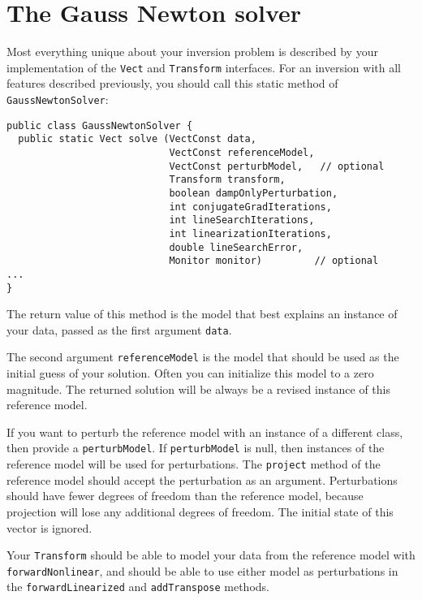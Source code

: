 \documentclass[12pt]{article}
\begin{document}
\section {The Gauss Newton solver}

Most everything unique about your inversion
problem is described by your implementation
of the \texttt{Vect} and \texttt{Transform}
interfaces.  For an inversion with all
features described previously, you should
call this static method of
\texttt{Gauss\-Newton\-Solver}:

{\footnotesize \begin{verbatim} 
public class GaussNewtonSolver {
  public static Vect solve (VectConst data,
                            VectConst referenceModel,
                            VectConst perturbModel,   // optional
                            Transform transform,     
                            boolean dampOnlyPerturbation,
                            int conjugateGradIterations,
                            int lineSearchIterations,
                            int linearizationIterations,
                            double lineSearchError,
                            Monitor monitor)         // optional
...
}
\end{verbatim}} 

The return value of this method is the model
that best explains an instance of your data,
passed as the first argument \texttt{data}.

The second argument \texttt{referenceModel}
is the model that should be used as the
initial guess of your solution.  Often you
can initialize this model to a zero
magnitude.  The returned solution will be
always be a revised instance of this
reference model.

If you want to perturb the reference model
with an instance of a different class, then
provide a \texttt{perturbModel}.  If
\texttt{perturbModel} is null, then instances
of the reference model will be used for
perturbations.  The \texttt{project} method
of the reference model should accept the
perturbation as an argument.  Perturbations
should have fewer degrees of freedom than the
reference model, because projection will lose
any additional degrees of freedom.  The
initial state of this vector is ignored.

Your \texttt{Transform} should be able to
model your data from the reference model with
\texttt{forwardNonlinear}, and should be able
to use either model as perturbations in the
\texttt{forwardLinearized} and
\texttt{addTranspose} methods.
\end{document}
